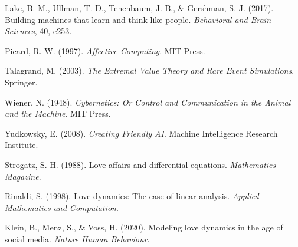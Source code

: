 \documentclass{article}
\begin{document}
Lake, B. M., Ullman, T. D., Tenenbaum, J. B., \& Gershman, S. J. (2017). Building machines that learn and think like people. \textit{Behavioral and Brain Sciences}, 40, e253.

Picard, R. W. (1997). \textit{Affective Computing}. MIT Press.

Talagrand, M. (2003). \textit{The Extremal Value Theory and Rare Event Simulations}. Springer.

Wiener, N. (1948). \textit{Cybernetics: Or Control and Communication in the Animal and the Machine}. MIT Press.

Yudkowsky, E. (2008). \textit{Creating Friendly AI}. Machine Intelligence Research Institute.

Strogatz, S. H. (1988). Love affairs and differential equations. \textit{Mathematics Magazine}.

Rinaldi, S. (1998). Love dynamics: The case of linear analysis. \textit{Applied Mathematics and Computation}.

Klein, B., Menz, S., \& Voss, H. (2020). Modeling love dynamics in the age of social media. \textit{Nature Human Behaviour}.
\end{document}
